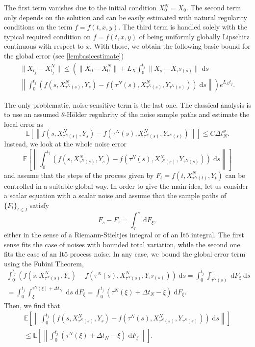 \documentclass[reqno,12pt]{amsart}
\theoremstyle{plain} %
\theoremstyle{definition} %
\begin{document}
The first term vanishes due to the initial condition $X_0^N = X_0$. The second term only depends on the solution and can be easily estimated with natural regularity conditions on the term $f=f(t, x, y)$. The third term is handled solely with the typical required condition on $f=f(t, x, y)$ of being uniformly globally Lipschitz continuous with respect to $x$. With those, we obtain the following basic bound for the global error (see \cref{lembasicestimate})
\begin{multline}
    \label{Etjbasicboundintro}
        \|X_{t_j} - X_{t_j}^N\| \leq \left( \|X_0 - X_0^N\| + L_X \int_0^{t_j} \|X_s - X_{\tau^N(s)}\| \;\mathrm{d}s \right. \\
        \left. \left\|\int_0^{t_j} \left( f(s, X_{\tau^N(s)}^N, Y_s) - f(\tau^N(s), X_{\tau^N(s)}^N, Y_{\tau^N(s)}) \right)\;\mathrm{d}s\right\|\right) e^{L_X t_j}.
\end{multline}

The only problematic, noise-sensitive term is the last one. The classical analysis is to use an assumed $\theta$-H\"older regularity of the noise sample paths and estimate the local error as
\[
    \mathbb{E}\left[\left\|f(s, X_{\tau^N(s)}^N, Y_s) - f(\tau^N(s), X_{\tau^N(s)}^N, Y_{\tau^N(s)})\right\|\right] \leq C\Delta t_N^{\theta}.
\]
Instead, we look at the whole noise error 
\[
    \mathbb{E}\left[\left\|\int_0^{t_j} \left( f(s, X_{\tau^N(s)}^N, Y_s) - f(\tau^N(s), X_{\tau^N(s)}^N, Y_{\tau^N(s)}) \right)\;\mathrm{d}s\right\|\right]
\]
and assume that the steps of the process given by $F_t = f(t, X_{\tau^N(t)}^N, Y_t)$ can be controlled in a suitable global way. In order to give the main idea, let us consider a scalar equation with a scalar noise and assume that the sample paths of $\{F_t\}_{t\in I}$ satisfy
\[
    F_s - F_\tau = \int_\tau^s \;\mathrm{d}F_\xi,
\]
either in the sense of a Riemann-Stieltjes integral or of an It\^o integral. The first sense fits the case of noises with bounded total variation, while the second one fits the case of an It\^o process noise. In any case, we bound the global error term using the Fubini Theorem,
\begin{multline*}
    \int_0^{t_j} \left( f(s, X_{\tau^N(s)}^N, Y_s) - f(\tau^N(s), X_{\tau^N(s)}^N, Y_{\tau^N(s)}) \right)\;\mathrm{d}s = \int_0^{t_j} \int_{\tau^N(s)}^s \;\mathrm{d}  F_\xi\;\mathrm{d}s \\
    = \int_0^{t_j} \int_{\xi}^{\tau^N(\xi) + \Delta t_N} \;\mathrm{d}s \;\mathrm{d} F_\xi  = \int_0^{t_j} (\tau^N(\xi) + \Delta t_N - \xi) \;\mathrm{d} F_\xi.
\end{multline*}
Then, we find that
\begin{multline*}
    \mathbb{E}\left[\left\| \int_0^{t_j} \left( f(s, X_{\tau^N(s)}^N, Y_s) - f(\tau^N(s), X_{\tau^N(s)}^N, Y_{\tau^N(s)}) \right)\;\mathrm{d}s\right\|\right] \\
    \leq \mathbb{E}\left[\left\| \int_0^{t_j} (\tau^N(\xi) + \Delta t_N - \xi) \;\mathrm{d} F_\xi \right\|\right].
\end{multline*}
\end{document}

